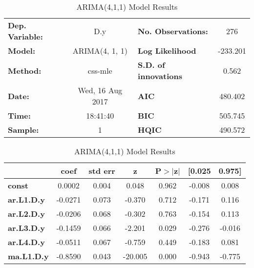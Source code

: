 \begin{table}[H]
\footnotesize
\begin{center}
\caption{ARIMA(4,1,1) Model Results}
\label{ARIMA(4,1,1)}
\begin{tabular}{lclc}
\toprule
\textbf{Dep. Variable:} &           D.y            & \textbf{  No. Observations:  } &            276             \\
\textbf{Model:}         &      ARIMA(4, 1, 1)      & \textbf{  Log Likelihood     } &          -233.201          \\
\textbf{Method:}        &         css-mle          & \textbf{  S.D. of innovations} &           0.562            \\
\textbf{Date:}          &     Wed, 16 Aug 2017     & \textbf{  AIC                } &          480.402           \\
\textbf{Time:}          &         18:41:40         & \textbf{  BIC                } &          505.745           \\
\textbf{Sample:}        &            1             & \textbf{  HQIC               } &          490.572           \\
\bottomrule
\end{tabular}
\begin{tabular}{lcccccc}
                   & \textbf{coef} & \textbf{std err} & \textbf{z} & \textbf{P$>$$|$z$|$} & \textbf{[0.025} & \textbf{0.975]}  \\
\midrule
\textbf{const}     &       0.0002  &        0.004     &     0.048  &         0.962        &       -0.008    &        0.008     \\
\textbf{ar.L1.D.y} &      -0.0271  &        0.073     &    -0.370  &         0.712        &       -0.171    &        0.116     \\
\textbf{ar.L2.D.y} &      -0.0206  &        0.068     &    -0.302  &         0.763        &       -0.154    &        0.113     \\
\textbf{ar.L3.D.y} &      -0.1459  &        0.066     &    -2.201  &         0.029        &       -0.276    &       -0.016     \\
\textbf{ar.L4.D.y} &      -0.0511  &        0.067     &    -0.759  &         0.449        &       -0.183    &        0.081     \\
\textbf{ma.L1.D.y} &      -0.8590  &        0.043     &   -20.005  &         0.000        &       -0.943    &       -0.775     \\
\bottomrule
\end{tabular}
\end{center}
\end{table}


